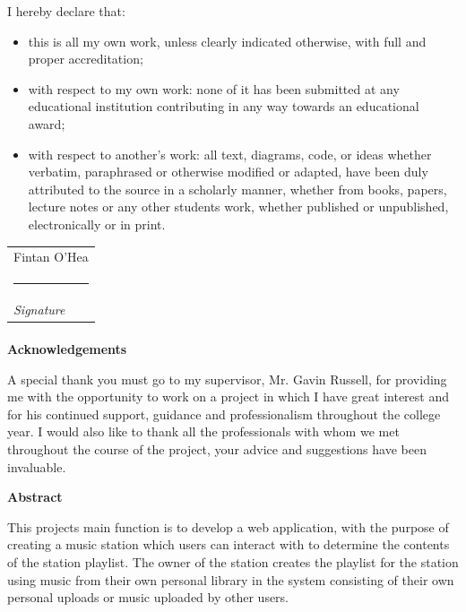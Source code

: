 \documentclass[a4paper, 12pt]{report}
\makeatletter
\newcommand{\namesigdate}[2][5cm]{%
  \begin{tabular}{@{}p{#1}@{}}
    #2 \\[2\normalbaselineskip] \hrule \\[0pt]
    {\small \textit{Signature}}
  \end{tabular}
}
\makeatother
\begin{document}
\begin{description}
\item[I hereby declare that:]
\end{description}
\begin{itemize}
\item this is all my own work, unless clearly indicated otherwise, with full and proper accreditation;
\item with respect to my own work: none of it has been submitted at any educational institution contributing in any way towards an educational award;
\item with respect to another’s work: all text, diagrams, code, or ideas whether verbatim, paraphrased or otherwise modified or adapted, have been duly attributed to the source in a scholarly manner, whether from books, papers, lecture notes or any other students work, whether published or unpublished, electronically or in print.
\end{itemize}
\vskip1.5cm
\noindent \namesigdate{Fintan O'Hea}

\clearpage

\paragraph{}
\begin{center}
\Large \textbf{Acknowledgements}
\end{center}
A special thank you must go to my supervisor, Mr. Gavin Russell, for providing me with the opportunity to work on a project in which I have great interest and for his continued support, guidance and professionalism throughout the college year. I would also like to thank all the professionals with whom we met throughout the course of the project, your advice and suggestions have been invaluable.\\

\vskip1.5cm

\begin{center}
\Large \textbf{Abstract}
\end{center}
This projects main function is to develop a web application, with the purpose of creating a music station which users can interact with to determine the contents of the station playlist. The owner of the station creates the playlist for the station using music from their own personal library in the system consisting of their own personal uploads or music uploaded by other users.  \\
\clearpage
\end{document}
